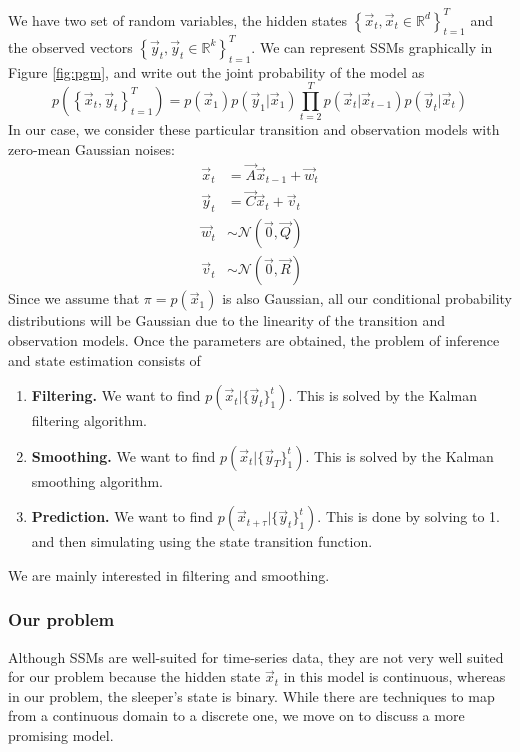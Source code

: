 	We have two set of random variables, the hidden states $\left\{ \vec{x}_t,\vec{x}_t \in \mathbb{R}^d \right\}_{t = 1}^{T}$ and the observed vectors $\left\{ \vec{y}_t, \vec{y}_t \in \mathbb{R}^k \right\}_{t = 1}^{T}$. We can represent SSMs graphically in Figure \ref{fig:pgm}, and write out the joint probability of the model as
	\begin{equation}
		p\left( \left\{ \vec x_t, \vec y_t \right\}_{t = 1}^{T} \right) = p(\vec x_1) p(\vec y_1 | \vec x_1) \prod_{t = 2}^{T} {p(\vec x_t | \vec x_{t - 1}) p(\vec y_t | \vec x_t)}
	\end{equation}
In our case, we consider these particular transition and observation models with zero-mean Gaussian noises:
	\begin{align}
		\vec x_t & = \vec A \vec x_{t - 1} + \vec w_t\\
		\vec y_t & = \vec C \vec x_t + \vec v_t \\
		\vec w_t & \sim \mathcal{N} (\vec 0, \vec Q) \\
		\vec v_t & \sim \mathcal{N} (\vec 0, \vec R)
	\end{align}
Since we assume that $\pi = p(\vec x_1)$ is also Gaussian, all our conditional probability distributions will be Gaussian due to the linearity of the transition and observation models. Once the parameters are obtained, the problem of inference and state estimation consists of	
	\begin{enumerate}
		\item \textbf{Filtering.} We want to find $p(\vec x_t | \{\vec y_t\}_1^t)$. This is solved by the Kalman filtering algorithm.
		\item \textbf{Smoothing.} We want to find $p(\vec x_t | \{\vec y_T\}_1^t)$. This is solved by the Kalman smoothing algorithm.
		\item \textbf{Prediction.} We want to find $p(\vec x_{t + \tau} | \{\vec y_t\}_1^t)$. This is done by solving to 1. and then simulating using the state transition function.
	\end{enumerate}
We are mainly interested in filtering and smoothing.

\subsubsection{Our problem}
	Although SSMs are well-suited for time-series data, they are not very well suited for our problem because the hidden state $\vec x_t$ in this model is continuous, whereas in our problem, the sleeper's state is binary. While there are techniques to map from a continuous domain to a discrete one, we move on to discuss a more promising model.